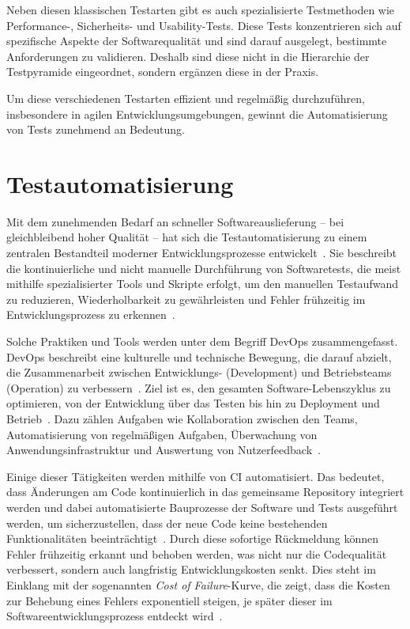Neben diesen klassischen Testarten gibt es auch spezialisierte Testmethoden wie Per\-for\-mance-, Sicherheits- und Usability-Tests.
Diese Tests konzentrieren sich auf spezifische Aspekte der Softwarequalität und sind darauf ausgelegt, bestimmte Anforderungen zu validieren.
Deshalb sind diese nicht in die Hierarchie der Testpyramide eingeordnet, sondern ergänzen diese in der Praxis.

Um diese verschiedenen Testarten effizient und regelmäßig durchzuführen, insbesondere in agilen Entwicklungsumgebungen, gewinnt die Automatisierung von Tests zunehmend an Bedeutung.

\section{Testautomatisierung}\label{sec:foundation_testautomation}

Mit dem zunehmenden Bedarf an schneller Softwareauslieferung -- bei gleichbleibend hoher Qualität -- hat sich die Testautomatisierung zu einem zentralen Bestandteil moderner Entwicklungsprozesse entwickelt~\cite{duvallContinuousIntegrationImproving2007}.
Sie beschreibt die kontinuierliche und nicht manuelle Durchführung von Softwaretests, die meist mithilfe spezialisierter Tools und Skripte erfolgt, um den manuellen Testaufwand zu reduzieren, Wiederholbarkeit zu gewährleisten und Fehler frühzeitig im Entwicklungsprozess zu erkennen~\cite{newmanBuildingMicroservices2021}.

Solche Praktiken und Tools werden unter dem Begriff \gls{DevOps} zusammengefasst.
\gls{DevOps} beschreibt eine kulturelle und technische Bewegung, die darauf abzielt, die Zusammenarbeit zwischen Entwicklungs- (Development) und Betriebsteams (Operation) zu verbessern~\cite{vijayakumaranDevOpsFrameworksTechniques2025}.
Ziel ist es, den gesamten Software-Lebenszyklus zu optimieren, von der Entwicklung über das Testen bis hin zu \gls{Deployment} und Betrieb~\cite{moeContinuousSoftwareTesting2015}.
Dazu zählen Aufgaben wie Kollaboration zwischen den Teams, Automatisierung von regelmäßigen Aufgaben, Überwachung von Anwendungsinfrastruktur und Auswertung von Nutzerfeedback~\cite{hemonInnovativePracticesKnowledge2020}.

Einige dieser Tätigkeiten werden mithilfe von \glsdesc{CI} automatisiert.
Das bedeutet, dass Änderungen am Code kontinuierlich in das gemeinsame Repository integriert werden und dabei automatisierte Bauprozesse der Software und Tests ausgeführt werden, um sicherzustellen, dass der neue Code keine bestehenden Funktionalitäten beeinträchtigt~\cite{vanmerodeContinuousIntegrationCI2023}.
Durch diese sofortige Rückmeldung können Fehler frühzeitig erkannt und behoben werden, was nicht nur die Codequalität verbessert, sondern auch langfristig Entwicklungskosten senkt.
Dies steht im Einklang mit der sogenannten \textit{Cost of Failure}-Kurve, die zeigt, dass die Kosten zur Behebung eines Fehlers exponentiell steigen, je später dieser im Softwareentwicklungsprozess entdeckt wird~\cite{boehmSoftwareEngineeringEconomics1984}.


